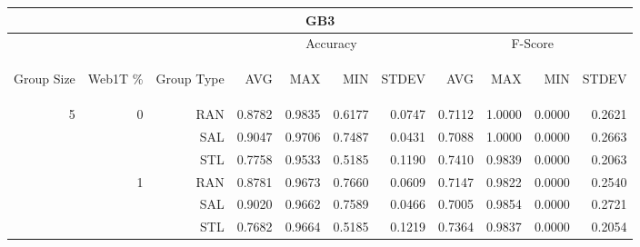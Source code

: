 \begin{center}
\begin{table}[htbp]
\begin{tabular}{ | r | r | r | r | r | r | r | r | r | r | r |}
\hline
\multicolumn{11}{|c|}{GB3}\\
\hline
 & & & \multicolumn{4}{|c|}{Accuracy} & \multicolumn{4}{|c|}{F-Score}\\ \cline{4-11}
\begin{sideways}Group Size\end{sideways} & \begin{sideways}Web1T \%\end{sideways} & \begin{sideways}Group Type\end{sideways} & \begin{sideways}AVG\end{sideways} & \begin{sideways}MAX\end{sideways} & \begin{sideways}MIN\end{sideways} & \begin{sideways}STDEV\end{sideways} & \begin{sideways}AVG\end{sideways} & \begin{sideways}MAX\end{sideways} & \begin{sideways}MIN\end{sideways} & \begin{sideways}STDEV\end{sideways}\\
\hline
\multirow{18}{*}{5}
 & \multirow{3}{*}{0} & RAN & 0.8782 & 0.9835 & 0.6177 & 0.0747 & 0.7112 & 1.0000 & 0.0000 & 0.2621\\ \cline{3-11}
 &   & SAL & 0.9047 & 0.9706 & 0.7487 & 0.0431 & 0.7088 & 1.0000 & 0.0000 & 0.2663\\ \cline{3-11}
 &   & STL & 0.7758 & 0.9533 & 0.5185 & 0.1190 & 0.7410 & 0.9839 & 0.0000 & 0.2063\\ \cline{2-11}
 & \multirow{3}{*}{1} & RAN & 0.8781 & 0.9673 & 0.7660 & 0.0609 & 0.7147 & 0.9822 & 0.0000 & 0.2540\\ \cline{3-11}
 &   & SAL & 0.9020 & 0.9662 & 0.7589 & 0.0466 & 0.7005 & 0.9854 & 0.0000 & 0.2721\\ \cline{3-11}
 &   & STL & 0.7682 & 0.9664 & 0.5185 & 0.1219 & 0.7364 & 0.9837 & 0.0000 & 0.2054\\ \cline{2-11}

\end{tabular}
\end{table}
\end{center}
